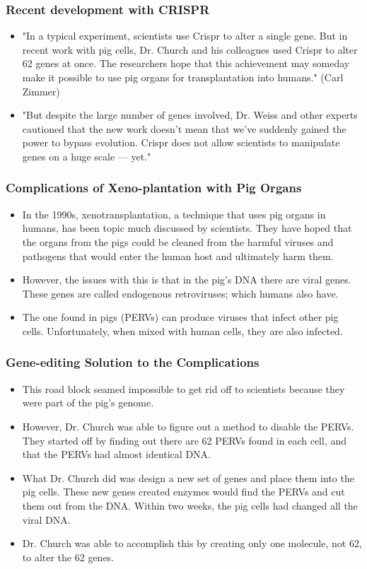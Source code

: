 \documentclass{beamer}
\begin{document}
\begin{frame}
\frametitle{Recent development with CRISPR}
\begin{itemize}
\item "In a typical experiment, scientists use Crispr to alter a single gene.
 But in recent work with pig cells, Dr. Church and his colleagues used Crispr
 to alter 62 genes at once. The researchers hope that this achievement may
 someday make it possible to use pig organs for transplantation into humans." 
(Carl Zimmer) 
\item "But despite the large number of genes involved, 
Dr. Weiss and other experts cautioned that the 
new work doesn’t mean that we’ve suddenly gained the power to 
bypass evolution. Crispr does not allow scientists to manipulate 
genes on a huge scale — yet."

\end{itemize}
\end{frame}

\begin{frame}
\frametitle{Complications of Xeno-plantation with Pig Organs}
\begin{itemize}
\item
In the 1990s, xenotransplantation, a technique that uses pig organs in humans, has been topic much discussed by scientists. They have hoped that the organs from the pigs could be cleaned from the harmful viruses and pathogens that would enter the human host and ultimately harm them. 
\item
However, the issues with this is that in the pig’s DNA there are viral genes. These genes are called endogenous retroviruses; which humans also have. 
\item
The one found in pigs (PERVs) can produce viruses that infect other pig cells. Unfortunately, when mixed with human cells, they are also infected. 
\end{itemize}
\end{frame}


\begin{frame}
\frametitle{Gene-editing Solution to the Complications}
\begin{itemize}
\item
This road block seamed impossible to get rid off to scientists because they were part of the pig’s genome. 
\item
However, Dr. Church was able to figure out a method to disable the PERVs. They started off by finding out there are 62 PERVs found in each cell, and that the PERVs had almost identical DNA. 
\item
What Dr. Church did was design a new set of genes and place them into the pig cells. These new genes created enzymes would find the PERVs and cut them out from the DNA. Within two weeks, the pig cells had changed all the viral DNA. 
\item
Dr. Church was able to accomplish this by creating only one molecule, not 62, to alter the 62 genes.
\end{itemize}
\end{frame}
\end{document}
